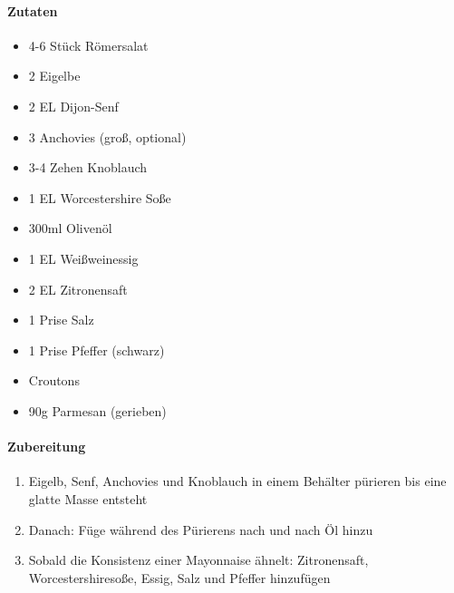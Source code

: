 \newpage
{}
\paragraph{Zutaten}
\begin{itemize}[noitemsep]
	\item 4-6 Stück Römersalat
	\item 2 Eigelbe
	\item 2 EL Dijon-Senf
	\item 3 Anchovies (groß, optional)
	\item 3-4 Zehen Knoblauch
	\item 1 EL Worcestershire Soße
	\item 300ml Olivenöl
	\item 1 EL Weißweinessig
	\item 2 EL Zitronensaft
	\item 1 Prise Salz
	\item 1 Prise Pfeffer (schwarz)
	\item Croutons
	\item 90g Parmesan (gerieben)
\end{itemize}
\paragraph{Zubereitung}
\begin{enumerate}[noitemsep]
	\item Eigelb, Senf, Anchovies und Knoblauch in einem Behälter pürieren bis eine glatte Masse entsteht
	\item Danach: Füge während des Pürierens nach und nach Öl hinzu
	\item Sobald die Konsistenz einer Mayonnaise ähnelt: Zitronensaft, Worcestershiresoße, Essig, Salz und Pfeffer hinzufügen
\end{enumerate}